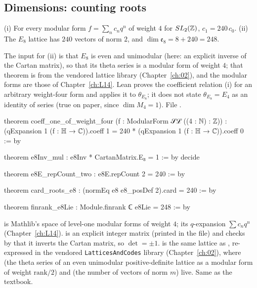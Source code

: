 \subsection{Dimensions: counting roots}

\begin{theorem}[$\dim\mathfrak e_8=248$, from $\theta_{E_8}=E_4$]\label{l23:thm:e8dim}
(i) For every modular form $f=\sum_nc_nq^n$ of weight $4$ for $SL_2({\mathbb{Z}})$, $c_1=240\,c_0$. (ii) The $E_8$ lattice has $240$ vectors of
norm $2$, and $\dim\mathfrak e_8=8+240=248$.
\end{theorem}
\noindent The input for (ii) is that $E_8$ is even and unimodular (here: an explicit inverse of the Cartan matrix), so that its theta
series is a modular form of weight $4$; that theorem is from the vendored lattice library (Chapter~\ref{ch:02}), and the modular forms are
those of Chapter~\ref{ch:L14}. Lean proves the coefficient relation (i) for an arbitrary weight-four form and applies it to
$\theta_{E_8}$; it does not state $\theta_{E_8}=E_4$ as an identity of series (true on paper, since $\dim M_4=1$).
\noindent File .
\begin{leancode}
theorem coeff_one_of_weight_four (f : ModularForm 𝒮ℒ ((4 : ℕ) : ℤ)) :
    (qExpansion 1 (f : ℍ → ℂ)).coeff 1 = 240 * (qExpansion 1 (f : ℍ → ℂ)).coeff 0 := by

theorem e8Inv_mul : e8Inv * CartanMatrix.E₈ = 1 := by decide

theorem e8E_repCount_two : e8E.repCount 2 = 240 := by

theorem card_roots_e8 : (normEq e8 e8_posDef 2).card = 240 := by

theorem finrank_e8Lie : Module.finrank ℂ e8Lie = 248 := by
\end{leancode}

\begin{dictionary}
 is Mathlib's space of level-one modular forms of weight $4$;  its $q$-expansion
$\sum c_nq^n$ (Chapter~\ref{ch:L14}).  is an explicit integer matrix (printed in the file) and  checks
by  that it inverts the Cartan matrix, so $\det=\pm1$.  is the same lattice as , re-expressed in the
vendored \texttt{LatticesAndCodes} library (Chapter~\ref{ch:02}), where  (the theta series of an even
unimodular positive-definite lattice as a modular form of weight $\mathrm{rank}/2$) and  (the number of vectors of
norm $m$) live. Same as the textbook.
\end{dictionary}

